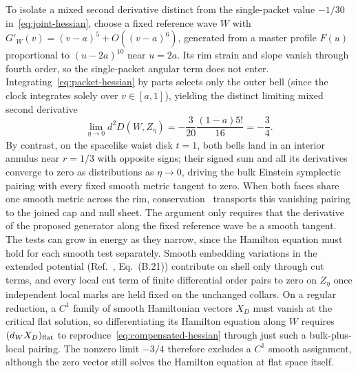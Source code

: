 \documentclass[10pt,a4paper]{article}
\numberwithin{equation}{section}
\begin{document}
To isolate a mixed second derivative distinct from the single-packet value $-1/30$ in~\eqref{eq:joint-hessian}, choose a fixed reference wave $W$ with $G'_W(v)=(v-a)^5+O((v-a)^6)$, generated from a master profile $F(u)$ proportional to $(u-2a)^{10}$ near $u=2a$. Its rim strain and slope vanish through fourth order, so the single-packet angular term does not enter. Integrating~\eqref{eq:packet-hessian} by parts selects only the outer bell (since the clock integrates solely over $v\in[a,1]$), yielding the distinct limiting mixed second derivative
\begin{equation}
 \lim_{\eta\to0} d^2D(W,Z_\eta)
 =-\frac{3}{20}\frac{(1-a)5!}{16}=-\frac34 .
 \label{eq:compensated-hessian}
\end{equation}
By contrast, on the spacelike waist disk $t=1$, both bells land in an interior annulus near $r=1/3$ with opposite signs; their signed sum and all its derivatives converge to zero as distributions as $\eta\to0$, driving the bulk Einstein symplectic pairing with every fixed smooth metric tangent to zero. When both faces share one smooth metric across the rim, conservation~\cite{IyerWald1994} transports this vanishing pairing to the joined cap and null sheet. The argument only requires that the derivative of the proposed generator along the fixed reference wave be a smooth tangent. The tests can grow in energy as they narrow, since the Hamilton equation must hold for each smooth test separately. Smooth embedding variations in the extended potential (Ref.~\cite{Chandrasekaran2026}, Eq.~(B.21)) contribute on shell only through cut terms, and every local cut term of finite differential order pairs to zero on $Z_\eta$ once independent local marks are held fixed on the unchanged collars. On a regular reduction, a $C^1$ family of smooth Hamiltonian vectors $X_D$ must vanish at the critical flat solution, so differentiating its Hamilton equation along $W$ requires $(d_W X_D)_{\rm flat}$ to reproduce~\eqref{eq:compensated-hessian} through just such a bulk-plus-local pairing. The nonzero limit $-3/4$ therefore excludes a $C^1$ smooth assignment, although the zero vector still solves the Hamilton equation at flat space itself.
\end{document}
